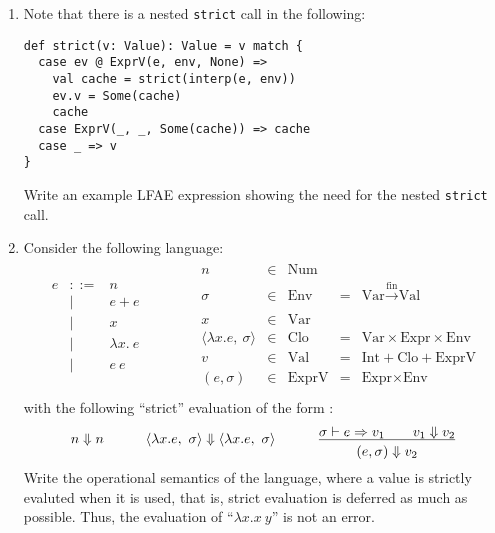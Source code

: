 \begin{enumerate}
\begin{itemize}
\end{itemize}

\item Note that there is a nested \texttt{strict} call in the following:

\begin{verbatim}
def strict(v: Value): Value = v match {
  case ev @ ExprV(e, env, None) =>
    val cache = strict(interp(e, env))
    ev.v = Some(cache)
    cache
  case ExprV(_, _, Some(cache)) => cache
  case _ => v
}
\end{verbatim}
Write an example LFAE expression showing the need for the nested \texttt{strict} call.

\item Consider the following language:
\[
\begin{array}{lll}
\begin{array}{rrl}
\\
  e & ::= & n\\
        & | & e + e\\
        & | & x\\
        & | & \lambda x.\ e\\
        & | & e\ e\\
\end{array}
&\qquad&
\begin{array}{rclcl}
n & \in & \mbox{Num}&&\\
  \sigma &\in& \mbox{Env} &=& {\mbox{Var}} \xrightarrow[]{\text{fin}} {\mbox{Val}}\\
  x &\in& \mbox{Var} &&\\

  \langle\lambda x. e,\ \sigma\rangle &\in& \mbox{Clo} &=& \mbox{Var} \times \mbox{Expr} \times \mbox{Env}\\
  v &\in& \mbox{Val} &=& \mbox{Int} + \mbox{Clo} + \mbox{ExprV}\\
  (e, \sigma) &\in& \mbox{ExprV} &=& \mbox{Expr} \times \mbox{Env}\\
\end{array}
\end{array}
\]
with the following ``strict'' evaluation of the form :
\[
\begin{array}{lll}
n \Downarrow n
&\qquad
\langle\lambda x. e,\ \sigma\rangle \Downarrow \langle\lambda x. e,\ \sigma\rangle
&\qquad
\newinfrule
{\sigma \vdash e \Rightarrow v_1 \qquad
v_1 \Downarrow v_2 }
{(e, \sigma) \Downarrow v_2}
\end{array}
\]
Write the operational semantics of the language, where a value is strictly evaluted
when it is used, that is, strict evaluation is deferred as much as possible.
Thus, the evaluation of ``$\lambda x.x~y$'' is not an error.


\end{enumerate}
